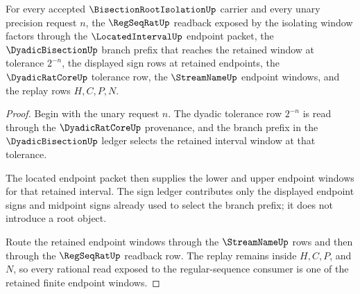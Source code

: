 \begin{theorem}
\label{thm:bisection-root-isolation-regseqrat-window-handoff}
For every accepted $\BisectionRootIsolationUp$ carrier and every unary precision request $n$, the $\RegSeqRatUp$ readback exposed by the isolating window factors through the $\LocatedIntervalUp$ endpoint packet, the $\DyadicBisectionUp$ branch prefix that reaches the retained window at tolerance $2^{-n}$, the displayed sign rows at retained endpoints, the $\DyadicRatCoreUp$ tolerance row, the $\StreamNameUp$ endpoint windows, and the replay rows $H,C,P,N$.
\end{theorem}
\begin{proof}
Begin with the unary request $n$. The dyadic tolerance row $2^{-n}$ is read through the $\DyadicRatCoreUp$ provenance, and the branch prefix in the $\DyadicBisectionUp$ ledger selects the retained interval window at that tolerance.

The located endpoint packet then supplies the lower and upper endpoint windows for that retained interval. The sign ledger contributes only the displayed endpoint signs and midpoint signs already used to select the branch prefix; it does not introduce a root object.

Route the retained endpoint windows through the $\StreamNameUp$ rows and then through the $\RegSeqRatUp$ readback row. The replay remains inside $H,C,P$, and $N$, so every rational read exposed to the regular-sequence consumer is one of the retained finite endpoint windows.
\end{proof}

